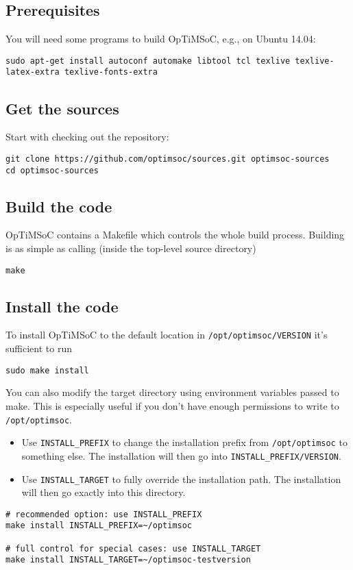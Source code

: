 \subsection{Prerequisites}

You will need some programs to build OpTiMSoC, e.g., on Ubuntu 14.04:

\begin{lstlisting}
sudo apt-get install autoconf automake libtool tcl texlive texlive-latex-extra texlive-fonts-extra
\end{lstlisting}

\subsection{Get the sources}

Start with checking out the repository:

\begin{lstlisting}
git clone https://github.com/optimsoc/sources.git optimsoc-sources
cd optimsoc-sources
\end{lstlisting}

\subsection{Build the code}

OpTiMSoC contains a Makefile which controls the whole build process. Building is
as simple as calling (inside the top-level source directory)

\begin{lstlisting}
make
\end{lstlisting}

\subsection{Install the code}
To install OpTiMSoC to the default location in \verb|/opt/optimsoc/VERSION|
it's sufficient to run

\begin{lstlisting}
sudo make install
\end{lstlisting}

You can also modify the target directory using environment variables passed to
make. This is especially useful if you don't have enough permissions to
write to \verb|/opt/optimsoc|.

\begin{itemize}
  \item Use \verb|INSTALL_PREFIX| to change the installation prefix from
    \verb|/opt/optimsoc| to something else. The installation will then go
    into \verb|INSTALL_PREFIX/VERSION|.
  \item Use \verb|INSTALL_TARGET| to fully override the installation path.
    The installation will then go exactly into this directory.
\end{itemize}

\begin{lstlisting}
# recommended option: use INSTALL_PREFIX
make install INSTALL_PREFIX=~/optimsoc

# full control for special cases: use INSTALL_TARGET
make install INSTALL_TARGET=~/optimsoc-testversion
\end{lstlisting}
